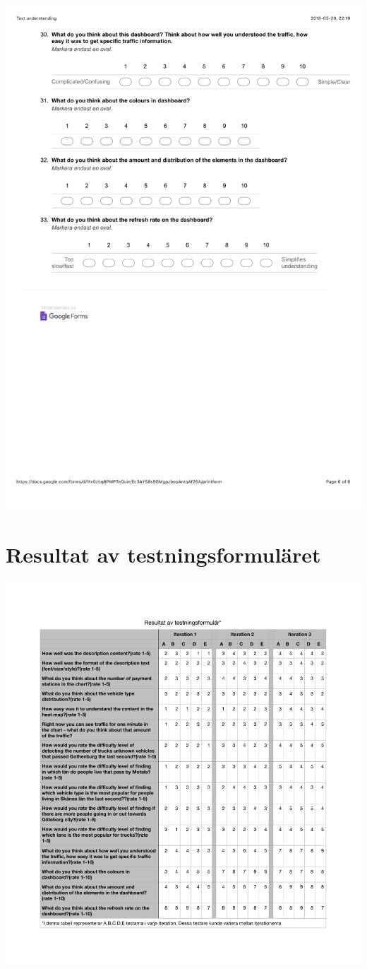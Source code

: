 \documentclass[12pt]{kththesis}
\begin{document}
\begin{appendices}
\includegraphics[width=1\textwidth]{TextUnderstanding6.pdf}
\newpage
\section{Resultat av testningsformuläret}
\includegraphics[width=1\textwidth]{TrafficDashboard.pdf}
\newpage

\end{appendices}
\end{document}
